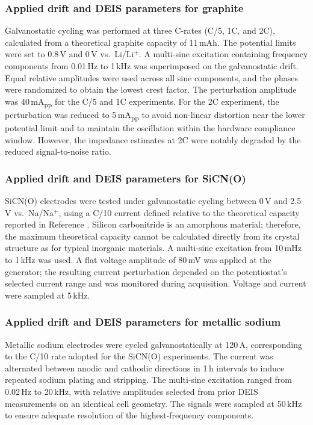 \subsubsection{Applied drift and DEIS parameters for graphite}
Galvanostatic cycling was performed at three C-rates (C/5, 1C, and 2C), calculated from a theoretical graphite capacity of 11\,mAh.  
The potential limits were set to 0.8\,V and 0\,V vs.\ Li/Li$^+$.  
A multi-sine excitation containing frequency components from 0.01\,Hz to 1\,kHz was superimposed on the galvanostatic drift.  
Equal relative amplitudes were used across all sine components, and the phases were randomized to obtain the lowest crest factor.  
The perturbation amplitude was 40\,mA\textsubscript{pp} for the C/5 and 1C experiments.  
For the 2C experiment, the perturbation was reduced to 5\,mA\textsubscript{pp} to avoid non-linear distortion near the lower potential limit and to maintain the oscillation within the hardware compliance window.  
However, the impedance estimates at 2C were notably degraded by the reduced signal-to-noise ratio.

\subsubsection{Applied drift and DEIS parameters for SiCN(O)}
SiCN(O) electrodes were tested under galvanostatic cycling between 0\,V and 2.5\,V vs.\ Na/Na$^+$, using a C/10 current defined relative to the theoretical capacity reported in Reference \cite{derilReversibleSodiumPlating2023}.
Silicon carbonitride is an amorphous material; therefore, the maximum theoretical capacity cannot be calculated directly from its crystal structure as for typical inorganic materials.
A multi-sine excitation from 10\,mHz to 1\,kHz was used. 
A flat voltage amplitude of 80\,mV was applied at the generator; the resulting current perturbation depended on the potentiostat's selected current range and was monitored during acquisition.  
Voltage and current were sampled at 5\,kHz.

\subsubsection{Applied drift and DEIS parameters for metallic sodium}
Metallic sodium electrodes were cycled galvanostatically at 120\,\textmu A, corresponding to the C/10 rate adopted for the SiCN(O) experiments.
The current was alternated between anodic and cathodic directions in 1\,h intervals to induce repeated sodium plating and stripping.  
The multi-sine excitation ranged from 0.02\,Hz to 20\,kHz, with relative amplitudes selected from prior DEIS measurements on an identical cell geometry.  
The signals were sampled at 50\,kHz to ensure adequate resolution of the highest-frequency components.

